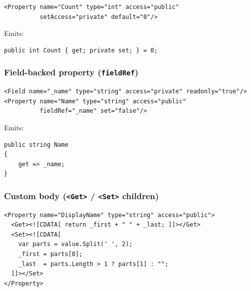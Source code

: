 \documentclass[11pt,a4paper]{article}
\newcommand{\el}[1]{\texttt{\textcolor{xoop-keyword}{<#1>}}}
\newcommand{\attr}[1]{\texttt{\textcolor{xoop-attr}{#1}}}
\begin{document}
\begin{lstlisting}[caption={Auto-property}]
<Property name="Count" type="int" access="public"
          setAccess="private" default="0"/>
\end{lstlisting}

Emits:
\begin{lstlisting}[style=csstyle, numbers=none]
public int Count { get; private set; } = 0;
\end{lstlisting}

\subsubsection{Field-backed property (\attr{fieldRef})}

\begin{lstlisting}[caption={Field-backed read-only property}]
<Field name="_name" type="string" access="private" readonly="true"/>
<Property name="Name" type="string" access="public"
          fieldRef="_name" set="false"/>
\end{lstlisting}

Emits:
\begin{lstlisting}[style=csstyle, numbers=none]
public string Name
{
    get => _name;
}
\end{lstlisting}

\subsubsection{Custom body (\el{Get} / \el{Set} children)}

\begin{lstlisting}[caption={Property with custom accessors}]
<Property name="DisplayName" type="string" access="public">
  <Get><![CDATA[ return _first + " " + _last; ]]></Get>
  <Set><![CDATA[
    var parts = value.Split(' ', 2);
    _first = parts[0];
    _last  = parts.Length > 1 ? parts[1] : "";
  ]]></Set>
</Property>
\end{lstlisting}
\end{document}
